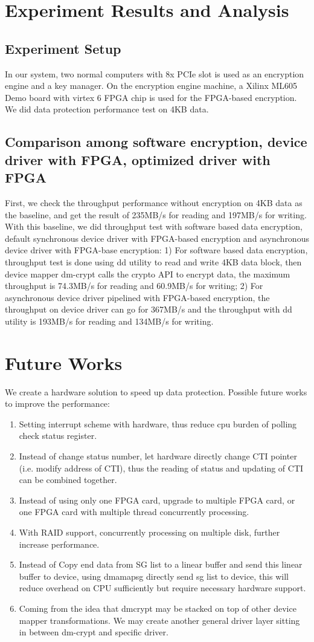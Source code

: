 \documentclass[10pt]{report}
\begin{document}
		\section{Experiment Results and Analysis}
			\subsection{Experiment Setup}
			In our system, two normal computers with 8x PCIe slot is used as an encryption engine and a key manager. On the encryption engine machine, a Xilinx ML605 Demo board with virtex 6 FPGA chip is used for the FPGA-based encryption. We did data protection performance test on 4KB data.
			\subsection{Comparison among software encryption, device driver with FPGA, optimized driver with FPGA}
			First, we check the throughput performance without encryption on 4KB data as the baseline, and get the result of 235MB/s for reading and 197MB/s for writing. With this baseline, we did throughput test with software based data encryption, default synchronous device driver with FPGA-based encryption and asynchronous device driver with FPGA-base encryption: 1) For software based data encryption, throughput test is done using dd utility to read and write 4KB data block, then device mapper dm-crypt calls the crypto API to encrypt data, the maximum throughput is 74.3MB/s for reading and 60.9MB/s for writing; 2) For asynchronous device driver pipelined with FPGA-based encryption, the throughput on device driver can go for 367MB/s and the throughput with dd utility is 193MB/s for reading and 134MB/s for writing.
			\section{Future Works}
		We create a hardware solution to speed up data protection. Possible future works to improve the performance:
		\begin{enumerate}
				\item Setting interrupt scheme with hardware, thus reduce cpu burden of polling check status register.
				\item Instead of change status number, let hardware directly change CTI pointer (i.e. modify address of CTI), thus the reading of status and updating of CTI can be combined together.
				\item Instead of using only one FPGA card, upgrade to multiple FPGA card, or one FPGA card with multiple thread concurrently processing.
				\item With RAID support, concurrently processing on multiple disk, further increase performance.
				\item Instead of Copy end data from SG list to a linear buffer and send this linear buffer to device, using dmamapsg directly send sg list to device, this will reduce overhead on CPU sufficiently but require necessary hardware support.
				\item Coming from the idea that dmcrypt may be stacked on top of other device mapper transformations. We may create another general driver layer sitting in between dm-crypt and specific driver.
		\end{enumerate}
\end{document}
